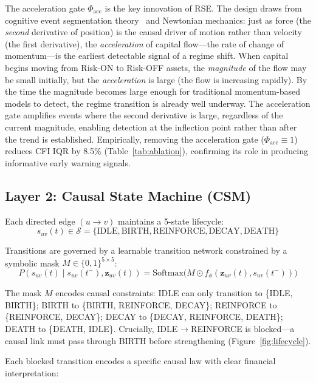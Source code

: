 \documentclass[11pt]{article}
\newcommand{\Softmax}{\mathrm{Softmax}}
\begin{document}
The acceleration gate $\Phi_{\text{acc}}$ is the key innovation of RSE. The design draws from cognitive event segmentation theory~\citep{zacks2007event} and Newtonian mechanics: just as force (the \emph{second} derivative of position) is the causal driver of motion rather than velocity (the first derivative), the \emph{acceleration} of capital flow---the rate of change of momentum---is the earliest detectable signal of a regime shift. When capital begins moving from Risk-ON to Risk-OFF assets, the \emph{magnitude} of the flow may be small initially, but the \emph{acceleration} is large (the flow is increasing rapidly). By the time the magnitude becomes large enough for traditional momentum-based models to detect, the regime transition is already well underway. The acceleration gate amplifies events where the second derivative is large, regardless of the current magnitude, enabling detection at the inflection point rather than after the trend is established. Empirically, removing the acceleration gate ($\Phi_{\text{acc}} \equiv 1$) reduces CFI IQR by 8.5\% (Table~\ref{tab:ablation}), confirming its role in producing informative early warning signals.

\subsection{Layer 2: Causal State Machine (CSM)}

Each directed edge $(u \to v)$ maintains a 5-state lifecycle:
\begin{equation}
    s_{uv}(t) \in \mathcal{S} = \{\text{IDLE}, \text{BIRTH}, \text{REINFORCE}, \text{DECAY}, \text{DEATH}\}
\end{equation}

Transitions are governed by a learnable transition network constrained by a symbolic mask $M \in \{0,1\}^{5 \times 5}$:
\begin{equation}
    P(s_{uv}(t) \mid s_{uv}(t^-), \mathbf{z}_{uv}(t)) = \Softmax\bigl(M \odot f_\phi(\mathbf{z}_{uv}(t), s_{uv}(t^-))\bigr)
\end{equation}

The mask $M$ encodes causal constraints: IDLE can only transition to \{IDLE, BIRTH\}; BIRTH to \{BIRTH, REINFORCE, DECAY\}; REINFORCE to \{REINFORCE, DECAY\}; DECAY to \{DECAY, REINFORCE, DEATH\}; DEATH to \{DEATH, IDLE\}. Crucially, IDLE$\to$REINFORCE is blocked---a causal link must pass through BIRTH before strengthening (Figure~\ref{fig:lifecycle}).

Each blocked transition encodes a specific causal law with clear financial interpretation:
\end{document}
